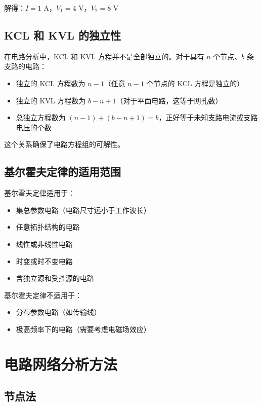 解得：$I = 1$ A，$V_1 = 4$ V，$V_2 = 8$ V

\subsection{KCL 和 KVL 的独立性}

在电路分析中，KCL 和 KVL 方程并不是全部独立的。对于具有 $n$ 个节点、$b$ 条支路的电路：

\begin{itemize}
  \item 独立的 KCL 方程数为 $n-1$（任意 $n-1$ 个节点的 KCL 方程是独立的）
  \item 独立的 KVL 方程数为 $b-n+1$（对于平面电路，这等于网孔数）
  \item 总独立方程数为 $(n-1) + (b-n+1) = b$，正好等于未知支路电流或支路电压的个数
\end{itemize}

这个关系确保了电路方程组的可解性。

\subsection{基尔霍夫定律的适用范围}

基尔霍夫定律适用于：

\begin{itemize}
  \item 集总参数电路（电路尺寸远小于工作波长）
  \item 任意拓扑结构的电路
  \item 线性或非线性电路
  \item 时变或时不变电路
  \item 含独立源和受控源的电路
\end{itemize}

基尔霍夫定律不适用于：

\begin{itemize}
  \item 分布参数电路（如传输线）
  \item 极高频率下的电路（需要考虑电磁场效应）
\end{itemize}

\section{电路网络分析方法}

\subsection{节点法}

